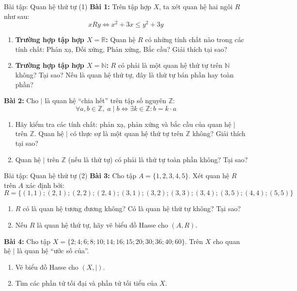 \documentclass[12pt,a4paper]{article}
\begin{document}
\begin{baitap}{Bài tập: Quan hệ thứ tự (1)}
\textbf{Bài 1:} Trên tập hợp $X$, ta xét quan hệ hai ngôi $R$ như sau:
\[
  xRy \iff x^2 + 3x \le y^2 + 3y
\]
\begin{enumerate}[label=\alph*)]
  \item \textbf{Trường hợp tập hợp $X = \mathbb{R}$:} Quan hệ $R$ có những tính chất nào trong các tính chất: Phản xạ, Đối xứng, Phản xứng, Bắc cầu? Giải thích tại sao?
  \item \textbf{Trường hợp tập hợp $X = \mathbb{N}$:} $R$ có phải là một quan hệ thứ tự trên $\mathbb{N}$ không? Tại sao? Nếu là quan hệ thứ tự, đây là thứ tự bán phần hay toàn phần?
\end{enumerate}

\textbf{Bài 2:} Cho $\mid$ là quan hệ ``chia hết'' trên tập số nguyên $\mathbb{Z}$:
\[
  \forall a, b \in \mathbb{Z},\; a \mid b \iff \exists k \in \mathbb{Z} : b = k \cdot a
\]
\begin{enumerate}[label=\alph*)]
  \item Hãy kiểm tra các tính chất: phản xạ, phản xứng và bắc cầu của quan hệ $\mid$ trên $\mathbb{Z}$. Quan hệ $\mid$ có thực sự là một quan hệ thứ tự trên $\mathbb{Z}$ không? Giải thích tại sao?
  \item Quan hệ $\mid$ trên $\mathbb{Z}$ (nếu là thứ tự) có phải là thứ tự toàn phần không? Tại sao?
\end{enumerate}
\end{baitap}

\begin{baitap}{Bài tập: Quan hệ thứ tự (2)}
\textbf{Bài 3:} Cho tập $A = \{1, 2, 3, 4, 5\}$. Xét quan hệ $R$ trên $A$ xác định bởi:
\[
  R = \{(1, 1); (2, 1); (2, 2); (2, 4); (3, 1); (3, 2); (3, 3); (3, 4); (3, 5); (4, 4); (5, 5)\}
\]
\begin{enumerate}[label=\alph*)]
  \item $R$ có là quan hệ tương đương không? Có là quan hệ thứ tự không? Tại sao?
  \item Nếu $R$ là quan hệ thứ tự, hãy vẽ biểu đồ Hasse cho $(A, R)$.
\end{enumerate}

\textbf{Bài 4:} Cho tập $X = \{2; 4; 6; 8; 10; 14; 16; 15; 20; 30; 36; 40; 60\}$. Trên $X$ cho quan hệ $\mid$ là quan hệ ``ước số của''.
\begin{enumerate}[label=\alph*)]
  \item Vẽ biểu đồ Hasse cho $(X, \mid)$.
  \item Tìm các phần tử tối đại và phần tử tối tiểu của $X$.
\end{enumerate}
\end{baitap}
\end{document}
